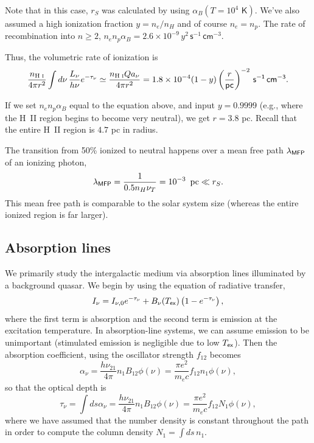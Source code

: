 \documentclass{tufte-handout}
\renewcommand{\rm}{\sf}
\renewcommand{\textrm}{\textsf}
\newcommand{\HI}{\textnormal{H{\smaller~\textsc{I}}}}
\newcommand{\HII}{\textnormal{H{\smaller~\textsc{II}}}}
\begin{document}
Note that in this case, $r_S$ was calculated by using $\alpha_B (T = 10^4\textrm{ K})$. We've also assumed a high ionization fraction $y = n_e/n_H$ and of course $n_e = n_p$. The rate of recombination into $n \geq 2$, $n_en_p \alpha_B = 2.6 \times 10^{-9} \, y^2\,\textrm{s}^{-1}\,\textrm{cm}^{-3}$.

Thus, the volumetric rate of ionization is
\begin{equation}
\frac{n_{\HI}}{4\pi r^2} \int d\nu\, \frac{L_\nu}{h\nu} e^{-\tau_\nu} \simeq \frac{n_{\HI} Q a_\nu}{4\pi r^2} = 1.8 \times 10^{-4} (1-y) \left (\frac{r}{\textrm{pc}}\right )^{-2} {\rm\, s^{-1}\, cm^{-3}}.
\end{equation}


If we set $n_en_p \alpha_B$ equal to the equation above, and input $y=0.9999$ (e.g., where the \HII{} region begins to become very neutral), we get $r=3.8$ pc. Recall that the entire \HII{} region is $4.7$ pc in radius.

The transition from 50\% ionized to neutral happens over a mean free path $\lambda_{\rm MFP}$ of an ionizing photon,
\begin{equation}
\lambda_{\rm MFP} = \frac{1}{0.5 n_H \nu_T} = 10^{-3} \text{\, pc} \ll r_S.
\end{equation}
This mean free path is comparable to the solar system size (whereas the entire ionized region is far larger).

\subsection{Absorption lines}
We primarily study the intergalactic medium via absorption lines illuminated by a background quasar. We begin by using the equation of radiative transfer,
\begin{equation}
I_\nu = I_{\nu, 0} e^{-\tau_\nu} + B_\nu(T_{\rm ex}) \left (1 - e^{-\tau_\nu}\right ),
\end{equation}
where the first term is absorption and the second term is emission at the excitation temperature. In absorption-line systems, we can assume emission to be unimportant (stimulated emission is negligible due to low $T_{\rm ex}$). Then the absorption coefficient, using the oscillator strength $f_{12}$ becomes
\begin{equation}
\alpha_\nu = \frac{h \nu_{21}}{4\pi} n_1 B_{12} \phi(\nu) = \frac{\pi e^2}{m_e c} f_{12} n_1 \phi(\nu),
\end{equation}
so that the optical depth is 
\begin{equation}
\tau_\nu = \int ds \alpha_\nu = \frac{h \nu_{21}}{4\pi} n_1 B_{12} \phi(\nu) = \frac{\pi e^2}{m_e c} f_{12} N_1 \phi(\nu),
\end{equation}
where we have assumed that the number density is constant throughout the path in order to compute the column density $N_1 = \int ds\, n_1$.
\end{document}

